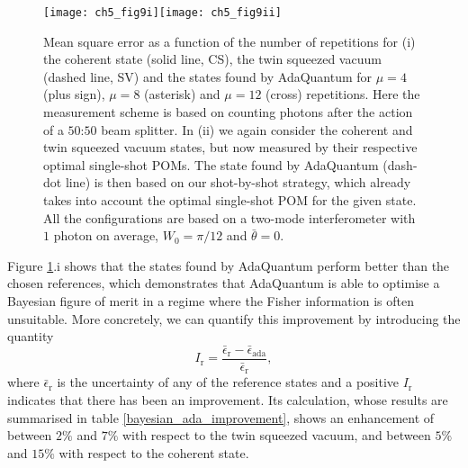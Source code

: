 \begin{figure}[t]
\centering
\texttt{[image: ch5\_fig9i]}\texttt{[image: ch5\_fig9ii]}
\caption[Performance of the schemes found by AdaQuantum]{Mean square error as a function of the number of repetitions for (i) the coherent state (solid line, CS), the twin squeezed vacuum (dashed line, SV) and the states found by AdaQuantum for $\mu = 4$ (plus sign), $\mu = 8$ (asterisk) and $\mu = 12$ (cross) repetitions. Here the measurement scheme is based on counting photons after the action of a $50$:$50$ beam splitter. In (ii) we again consider the coherent and twin squeezed vacuum states, but now measured by their respective optimal single-shot POMs. The state found by AdaQuantum (dash-dot line) is then based on our shot-by-shot strategy, which already takes into account the optimal single-shot POM for the given state. All the configurations are based on a two-mode interferometer with $1$ photon on average, $W_0 = \pi/12$ and $\bar{\theta} = 0$.}
\label{bmse_ada_results}
\end{figure}

Figure \ref{bmse_ada_results}.i shows that the states found by AdaQuantum perform better than the chosen references, which demonstrates that AdaQuantum is able to optimise a Bayesian figure of merit in a regime where the Fisher information is often unsuitable. More concretely, we can quantify this improvement by introducing the quantity
\begin{equation}
I_{\mathrm{r}}=\frac{\bar{\epsilon}_{\mathrm{r}}-\bar{\epsilon}_{\mathrm{ada}}}{\bar{\epsilon}_{\mathrm{r}}},
\label{improvement_factor}
\end{equation}
where $\bar{\epsilon}_{\mathrm{r}}$ is the uncertainty of any of the reference states and a positive $I_{\mathrm{r}}$ indicates that there has been an improvement. Its calculation, whose results are summarised in table \ref{bayesian_ada_improvement}, shows an enhancement of between $2\%$ and $7\%$ with respect to the twin squeezed vacuum, and between $5\%$ and $15\%$ with respect to the coherent state.

